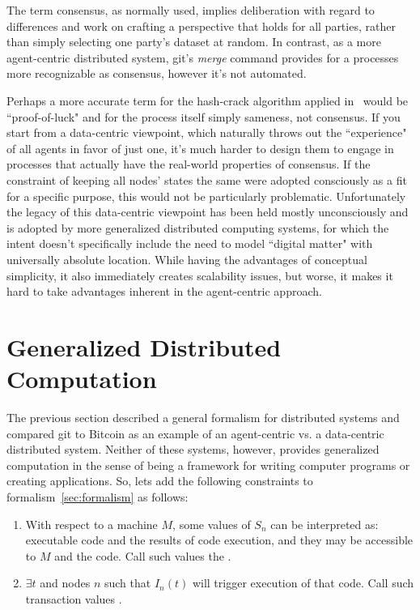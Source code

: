 \documentclass[twocolumn,showpacs,%
  nofootinbib,aps,superscriptaddress,%
  eqsecnum,prd,notitlepage,showkeys,10pt]{revtex4-1}
\begin{document}
The term consensus, as normally used, implies deliberation with regard to differences and work on crafting a perspective that holds for all parties, rather than simply selecting one party's dataset at random.  In contrast, as a more agent-centric distributed system, git's \textit{merge} command provides for a processes more recognizable as consensus, however it's not automated.

Perhaps a more accurate term for the hash-crack algorithm applied in \sbtc\ would be ``proof-of-luck" and for the process itself simply sameness, not consensus.  If you start from a data-centric viewpoint, which naturally throws out the ``experience" of all agents in favor of just one, it's much harder to design them to engage in processes that actually have the real-world properties of consensus. If the constraint of keeping all nodes' states the same were adopted consciously as a fit for a specific purpose, this would not be particularly problematic.  Unfortunately the legacy of this data-centric viewpoint has been held mostly unconsciously and is adopted by more generalized distributed computing systems, for which the intent doesn't specifically include the need to model ``digital matter" with universally absolute location.  While having the advantages of conceptual simplicity, it also immediately creates scalability issues, but worse, it makes it hard to take advantages inherent in the agent-centric approach.

\section{Generalized Distributed Computation}
\label{sec:dist-comp}

The previous section described a general formalism for distributed systems and compared git to Bitcoin as an example of an agent-centric vs. a data-centric distributed system.  Neither of these systems, however, provides generalized computation in the sense of being a framework for writing computer programs or creating applications. So, lets add the following constraints to formalism~\ref{sec:formalism} as follows:

\begin{enumerate}
\item With respect to a machine $M$, some values of $S_n$ can be interpreted as: executable code and the results of code execution, and they may be accessible to $M$ and the code.  Call such values the .
\item $\exists t$ and nodes $n$ such that $I_n(t)$ will trigger execution of that code. Call such transaction values .
\end{enumerate}
\end{document}
